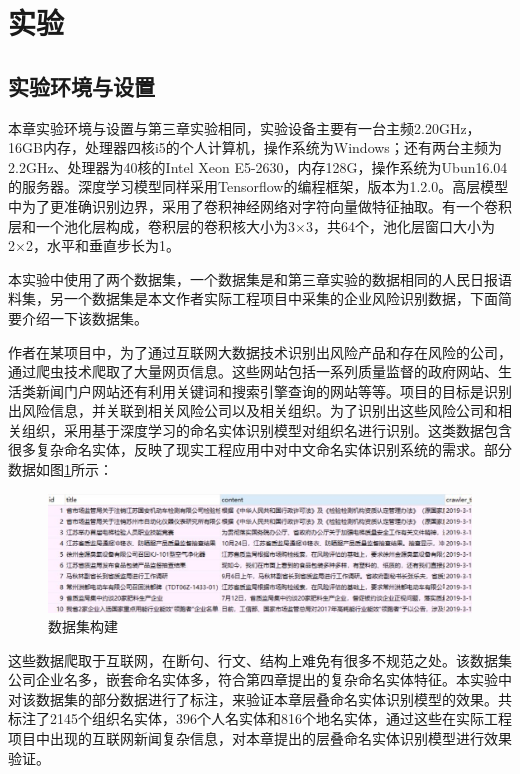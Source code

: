 \documentclass[winfonts,master,oneside,nobackinfo]{njuthesis}
\begin{document}
\section{实验}

\subsection{实验环境与设置}

本章实验环境与设置与第三章实验相同，实验设备主要有一台主频2.20GHz，16GB内存，处理器四核i5的个人计算机，操作系统为Windows；还有两台主频为2.2GHz、处理器为40核的Intel Xeon E5-2630，内存128G，操作系统为Ubun16.04的服务器。深度学习模型同样采用Tensorflow的编程框架，版本为1.2.0。高层模型中为了更准确识别边界，采用了卷积神经网络对字符向量做特征抽取。有一个卷积层和一个池化层构成，卷积层的卷积核大小为3×3，共64个，池化层窗口大小为2×2，水平和垂直步长为1。

本实验中使用了两个数据集，一个数据集是和第三章实验的数据相同的人民日报语料集，另一个数据集是本文作者实际工程项目中采集的企业风险识别数据，下面简要介绍一下该数据集。

作者在某项目中，为了通过互联网大数据技术识别出风险产品和存在风险的公司，通过爬虫技术爬取了大量网页信息。这些网站包括一系列质量监督的政府网站、生活类新闻门户网站还有利用关键词和搜索引擎查询的网站等等。项目的目标是识别出风险信息，并关联到相关风险公司以及相关组织。为了识别出这些风险公司和相关组织，采用基于深度学习的命名实体识别模型对组织名进行识别。这类数据包含很多复杂命名实体，反映了现实工程应用中对中文命名实体识别系统的需求。部分数据如图\ref{train-data}所示：

\begin{figure}[h]
\centering
\includegraphics[width=1\textwidth]{./figure/数据集.jpg}
\caption{数据集构建}
\label{train-data}
\end{figure}
这些数据爬取于互联网，在断句、行文、结构上难免有很多不规范之处。该数据集公司企业名多，嵌套命名实体多，符合第四章提出的复杂命名实体特征。本实验中对该数据集的部分数据进行了标注，来验证本章层叠命名实体识别模型的效果。共标注了2145个组织名实体，396个人名实体和816个地名实体，通过这些在实际工程项目中出现的互联网新闻复杂信息，对本章提出的层叠命名实体识别模型进行效果验证。
\end{document}

